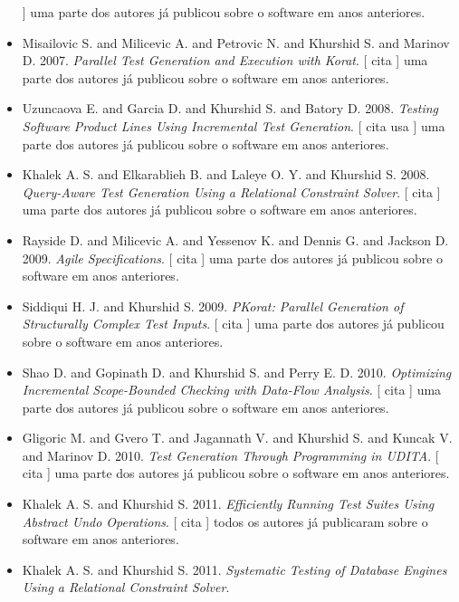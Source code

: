 \begin{itemize}
      ]
uma parte dos autores já publicou sobre o software em anos anteriores.
\item Misailovic S. and Milicevic A. and Petrovic N. and Khurshid S. and Marinov D.
      2007.
        \textit{ Parallel Test Generation and Execution with Korat}.
      [
          cita
      ]
uma parte dos autores já publicou sobre o software em anos anteriores.
\item Uzuncaova E. and Garcia D. and Khurshid S. and Batory D.
      2008.
        \textit{ Testing Software Product Lines Using Incremental Test Generation}.
      [
          cita
          usa
      ]
uma parte dos autores já publicou sobre o software em anos anteriores.
\item Khalek A. S. and Elkarablieh B. and Laleye O. Y. and Khurshid S.
      2008.
        \textit{ Query-Aware Test Generation Using a Relational Constraint Solver}.
      [
          cita
      ]
uma parte dos autores já publicou sobre o software em anos anteriores.
\item Rayside D. and Milicevic A. and Yessenov K. and Dennis G. and Jackson D.
      2009.
        \textit{ Agile Specifications}.
      [
          cita
      ]
uma parte dos autores já publicou sobre o software em anos anteriores.
\item Siddiqui H. J. and Khurshid S.
      2009.
        \textit{ PKorat: Parallel Generation of Structurally Complex Test Inputs}.
      [
          cita
      ]
uma parte dos autores já publicou sobre o software em anos anteriores.
\item Shao D. and Gopinath D. and Khurshid S. and Perry E. D.
      2010.
        \textit{ Optimizing Incremental Scope-Bounded Checking with Data-Flow Analysis}.
      [
          cita
      ]
uma parte dos autores já publicou sobre o software em anos anteriores.
\item Gligoric M. and Gvero T. and Jagannath V. and Khurshid S. and Kuncak V. and Marinov D.
      2010.
        \textit{ Test Generation Through Programming in UDITA}.
      [
          cita
      ]
uma parte dos autores já publicou sobre o software em anos anteriores.
\item Khalek A. S. and Khurshid S.
      2011.
        \textit{ Efficiently Running Test Suites Using Abstract Undo Operations}.
      [
          cita
      ]
todos os autores já publicaram sobre o software em anos anteriores.
\item Khalek A. S. and Khurshid S.
      2011.
        \textit{ Systematic Testing of Database Engines Using a Relational Constraint Solver}.

\end{itemize}
